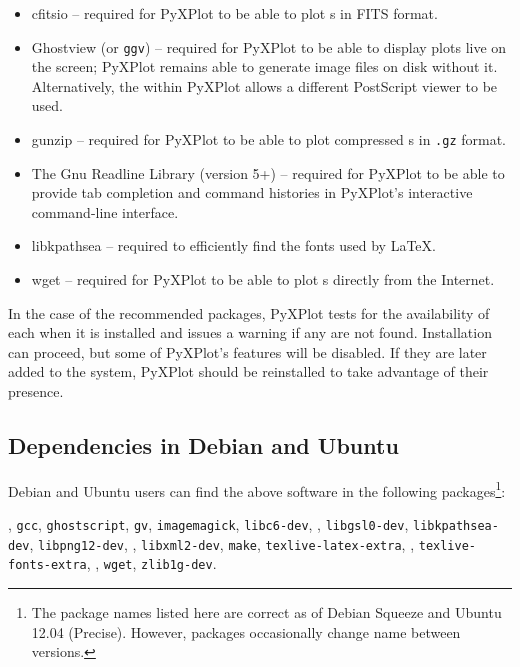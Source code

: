 \vspace{0.5cm}
\begin{itemize}
\item cfitsio -- required for PyXPlot to be able to plot \datafile s in FITS format.
\item Ghostview  (or {\tt ggv}) -- required for PyXPlot to be able to display plots live on the screen; PyXPlot remains able to generate image files on disk without it. Alternatively, the  within PyXPlot allows a different PostScript viewer to be used.
\item gunzip  -- required for PyXPlot to be able to plot compressed \datafile s in {\tt .gz} format.
\item The Gnu Readline Library (version 5+)  -- required for PyXPlot to be able to provide tab completion and command histories in PyXPlot's interactive command-line interface.
\item libkpathsea  -- required to efficiently find the fonts used by \LaTeX.
\item wget  -- required for PyXPlot to be able to plot \datafile s directly from the Internet.
\end{itemize}
\vspace{0.5cm}

\noindent In the case of the recommended packages, PyXPlot tests for the
availability of each when it is installed and issues a warning if any are not
found. Installation can proceed, but some of PyXPlot's features will be
disabled. If they are later added to the system, PyXPlot should be reinstalled
to take advantage of their presence.

\subsection{Dependencies in Debian and Ubuntu}

Debian and Ubuntu users can find the above software in the following
packages\footnote{The package names listed here are correct as of Debian
Squeeze and Ubuntu 12.04 (Precise). However, packages occasionally change name
between versions.}: 

\vspace{2mm}
, {\tt gcc}, {\tt ghostscript}, {\tt gv}, {\tt imagemagick}, {\tt libc6-dev},\newline
{}, {\tt libgsl0-dev}, {\tt libkpathsea-dev}, {\tt libpng12-dev},\newline
{}, {\tt libxml2-dev}, {\tt make}, {\tt texlive-latex-extra},\newline
{}, {\tt texlive-fonts-extra},\newline
{}, {\tt wget}, {\tt zlib1g-dev}.
\vspace{2mm}

